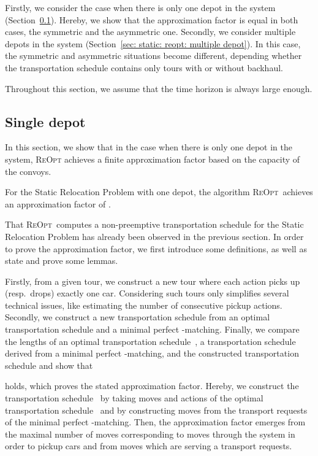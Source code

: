 \documentclass[english]{llncs}
\numberwithin{sublemma}{lemma}
\newcommand{\REOPT}{\textsc{ReOpt}\xspace}
\begin{document}
Firstly, we consider the case when there is only one depot in the system (Section~\ref{sec: static: reopt: single depot}).
Hereby, we show that the approximation factor is equal in both cases, the symmetric and the asymmetric one.
Secondly, we consider multiple depots in the system (Section~\ref{sec: static: reopt: multiple depot}).
In this case, the symmetric and asymmetric situations become different, depending whether the transportation schedule contains only tours with or without backhaul.


Throughout this section, we assume that the time horizon is always large enough.



\subsection{Single depot}
\label{sec: static: reopt: single depot}

In this section, we show that in the case when there is only one depot in the system, \REOPT achieves a finite approximation factor based on the capacity of the convoys.



\begin{theorem}\label{thm: static: reopt: approximation factor}
For the Static Relocation Problem  with one depot,
the algorithm \REOPT\ achieves an approximation factor of . \end{theorem}


That \REOPT\ computes a non-preemptive transportation schedule for the Static Relocation Problem has already been observed in the previous section.
In order to prove the approximation factor, we first introduce some definitions, as well as state and prove some lemmas.


Firstly, from a given tour, we construct a new tour where each action picks up (resp.~drops) exactly one car.
Considering such tours only simplifies several technical issues, like estimating the number of consecutive pickup actions.
Secondly, we construct a new transportation schedule from an optimal transportation schedule and a minimal perfect -matching.
Finally, we compare the lengths of an optimal transportation schedule~, a transportation schedule  derived from a minimal perfect -matching, and the constructed transportation schedule  and show that

holds, which proves the stated approximation factor.
Hereby, we construct the transportation schedule~ by taking moves and actions of the optimal transportation schedule~ and
by constructing moves from the transport requests of the minimal perfect -matching.
Then, the approximation factor  emerges from the maximal number of moves corresponding to moves through the system in order to pickup cars and from moves which are serving a transport requests.
\end{document}
